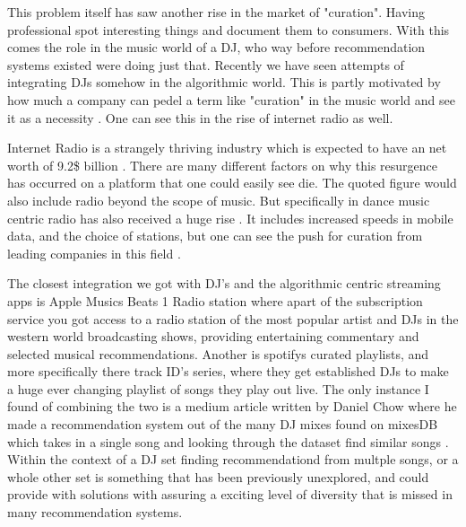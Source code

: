 This problem itself has saw another rise in the market of "curation". Having professional spot interesting things and document them to consumers. With this comes the role in the music world of a DJ, who way before recommendation systems existed were doing just that. Recently we have seen attempts of integrating DJs somehow in the algorithmic world. This is partly motivated by how much a company can pedel a term like "curation" in the music world and see it as a necessity \citep{barna_perfect_2017}. One can see this in the rise of internet radio as well.

Internet Radio is a strangely thriving industry which is expected to have an net worth of 9.2\$ billion \citep{market_research_future_internet_2022}. There are many different factors on why this resurgence has occurred on a platform that one could easily see die. The quoted figure would also include radio beyond the scope of music. But specifically in dance music centric radio has also received a huge rise \citep{gillett_how_2021}. It includes increased speeds in mobile data, and the choice of stations, but one can see the push for curation from leading companies in this field \citep{deane_media_apple_2020} \citep{nts_radio_nts_2023}.

The closest integration we got with DJ's and the algorithmic centric streaming apps is Apple Musics Beats 1 Radio station where apart of the subscription service you got access to a radio station of the most popular artist and DJs in the western world broadcasting shows, providing entertaining commentary and selected musical recommendations. Another is spotifys curated playlists, and more specifically there track ID's series, where they get established DJs to make a huge ever changing playlist of songs they play out live. The only instance I found of combining the two is a medium article written by Daniel Chow where he made a recommendation system out of the many DJ mixes found on mixesDB which takes in a single song and looking through the dataset find similar songs \citep{chow_music_2020}. Within the context of a DJ set finding recommendationd from multple songs, or a whole other set is something that has been previously unexplored, and could provide with solutions with assuring a exciting level of diversity that is missed in many recommendation systems.

